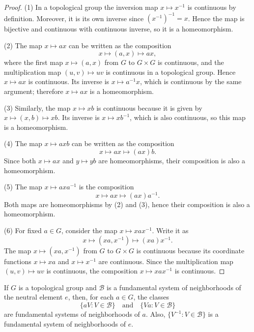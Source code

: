\begin{proof}
    (1) In a topological group the inversion map \( x \mapsto x^{-1} \) is continuous by definition.
    Moreover, it is its own inverse since \( (x^{-1})^{-1} = x \). Hence the map is bijective and
    continuous with continuous inverse, so it is a homeomorphism.

    (2) The map \( x \mapsto ax \) can be written as the composition
    \[
        x \mapsto (a,x) \mapsto ax,
    \]
    where the first map \( x \mapsto (a,x) \) from \( G \) to \( G \times G \) is continuous,
    and the multiplication map \( (u,v) \mapsto uv \) is continuous in a topological group.
    Hence \( x \mapsto ax \) is continuous. Its inverse is \( x \mapsto a^{-1}x \), which is
    continuous by the same argument; therefore \( x \mapsto ax \) is a homeomorphism.

    (3) Similarly, the map \( x \mapsto xb \) is continuous because it is given by
    \( x \mapsto (x,b) \mapsto xb \). Its inverse is \( x \mapsto xb^{-1} \), which is also
    continuous, so this map is a homeomorphism.

    (4) The map \( x \mapsto axb \) can be written as the composition
    \[
        x \mapsto ax \mapsto (ax)b.
    \]
    Since both \( x \mapsto ax \) and \( y \mapsto yb \) are homeomorphisms, their composition
    is also a homeomorphism.

    (5) The map \( x \mapsto axa^{-1} \) is the composition
    \[
        x \mapsto ax \mapsto (ax)a^{-1}.
    \]
    Both maps are homeomorphisms by (2) and (3), hence their composition is also a homeomorphism.

    (6) For fixed \( a \in G \), consider the map \( x \mapsto xax^{-1} \).
    Write it as
    \[
        x \mapsto (xa, x^{-1}) \mapsto (xa)x^{-1}.
    \]
    The map \( x \mapsto (xa, x^{-1}) \) from \( G \) to \( G \times G \) is continuous because
    its coordinate functions \( x \mapsto xa \) and \( x \mapsto x^{-1} \) are continuous.
    Since the multiplication map \( (u,v) \mapsto uv \) is continuous, the composition
    \( x \mapsto xax^{-1} \) is continuous.
\end{proof}


\begin{corollary}
    \label{cor:top-group-neighborhood-translation}

    If \( G \) is a topological group and \( \mathcal{B} \) is a fundamental system of neighborhoods of the neutral element \( e \),
    then, for each \( a \in G \), the classes
    \[
        \{ aV : V \in \mathcal{B} \} \quad \text{and} \quad \{ Va : V \in \mathcal{B} \}
    \]
    are fundamental systems of neighborhoods of \( a \).
    Also, \( \{ V^{-1} : V \in \mathcal{B} \} \) is a fundamental system of neighborhoods of \( e \).
\end{corollary}

